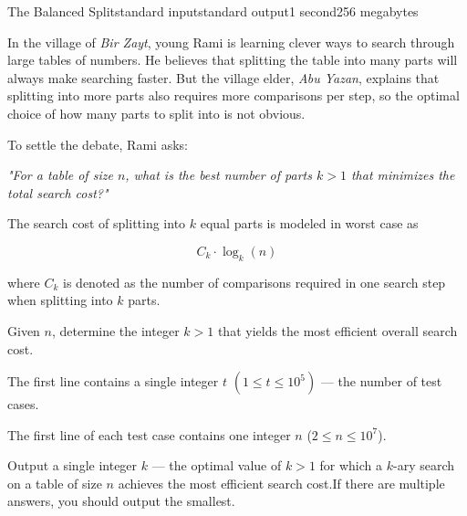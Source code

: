 \begin{problem}{The Balanced Split}{standard input}{standard output}{1 second}{256 megabytes}

In the village of \textit{Bir Zayt}, young Rami is learning clever ways to search through large tables of numbers.  
He believes that splitting the table into many parts will always make searching faster.  
But the village elder, \textit{Abu Yazan}, explains that splitting into more parts also requires more comparisons per step,  
so the optimal choice of how many parts to split into is not obvious.

To settle the debate, Rami asks:

\textit{"For a table of size $n$, what is the best number of parts $k>1$  
that minimizes the total search cost?"}

The search cost of splitting into $k$ equal parts is modeled in worst case as

$$ C_k \cdot \log_k(n)$$

where $C_k$ is denoted as the number of comparisons required in one search step when splitting into $k$ parts.

Given $n$, determine the integer $k>1$ that yields the most efficient overall search cost.


\InputFile
The first line contains a single integer $t$ $(1 \le t \le 10^5)$ --- the number of test cases.

The first line of each test case contains one integer $n$ ($2 \le n \le 10^7$).

\OutputFile
Output a single integer $k$ --- the optimal value of $k>1$ for which a $k$-ary search on a table of size $n$ achieves the most efficient search cost.If there are multiple answers, you should output the smallest.

\Example

\begin{example}
%
\end{example}

\end{problem}

